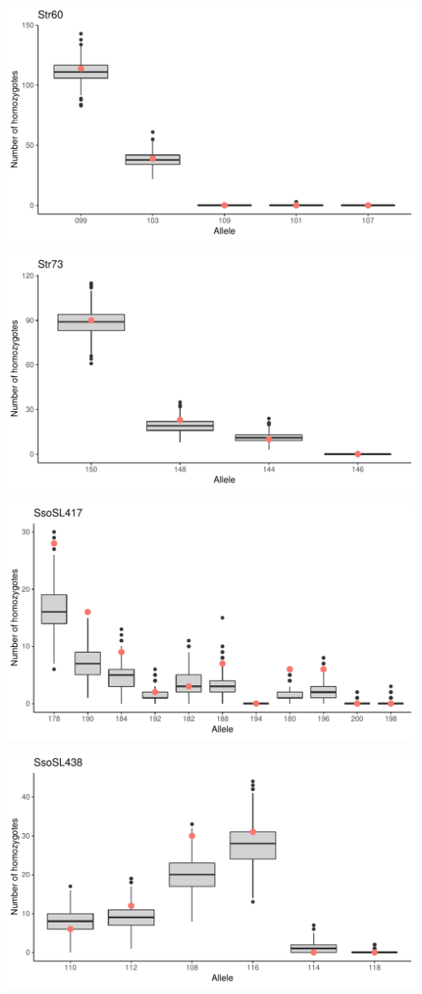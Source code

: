 \documentclass[a4paper]{scrartcl}\usepackage[]{graphicx}\usepackage[]{color}
\makeatletter
\def\maxwidth{ %
  \ifdim\Gin@nat@width>\linewidth
    \linewidth
  \else
    \Gin@nat@width
  \fi
}
\newenvironment{knitrout}{}{} %
\makeatother
\begin{document}
\begin{knitrout}
\includegraphics[width=\maxwidth]{PopGenReport_Hatchery-null_all-8} 

\includegraphics[width=\maxwidth]{PopGenReport_Hatchery-null_all-9} 

\includegraphics[width=\maxwidth]{PopGenReport_Hatchery-null_all-10} 

\includegraphics[width=\maxwidth]{PopGenReport_Hatchery-null_all-11} 


\end{knitrout}
\end{document}
